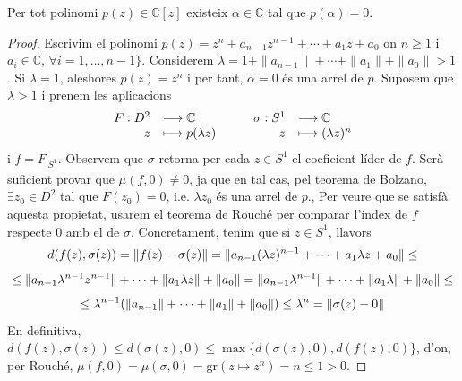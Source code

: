 \documentclass[../main.tex]{subfiles}
\begin{document}
\begin{ter}
\label{ter:teoremafonamentaldelalgebra} Per tot polinomi $p(z)\in\mathbb{C}[z]$ existeix $\alpha\in \mathbb{C}$ tal que $p(\alpha)=0$.
\end{ter}
\begin{proof}
Escrivim el polinomi $p(z) = z^n+a_{n-1}z^{n-1}+\cdots +a_1z+a_0$ on $n\geq 1$ i $a_i\in\mathbb{C}$, $\forall i=1,\ldots, n-1\}$. Considerem $\lambda = 1+\|a_{n-1}\|+\cdots+\|a_1\|+\|a_0\|>1$. Si $\lambda= 1$, aleshores $p(z) = z^n$ i per tant, $\alpha = 0$ és una arrel de $p$. Suposem que $\lambda>1$ i prenem les aplicacions
\begin{equation}
    \notag
    \begin{array}{rl}
        F:D^2 & \longrightarrow \mathbb{C} \\
        z & \longmapsto p(\lambda z)
    \end{array}
    \qquad
    \begin{array}{rl}
        \sigma:S^1 & \longrightarrow \mathbb{C} \\
        z & \longmapsto (\lambda z)^n
    \end{array}
\end{equation}
i $f = F_{|S^1}$. Observem que $\sigma$ retorna per cada $z\in S^1$ el coeficient líder de $f$. Serà suficient provar que $\mu(f,0)\not=0$, ja que en tal cas, pel teorema de Bolzano, $\exists z_0\in D^2$ tal que $F(z_0) = 0$, i.e. $\lambda z_0$ és una arrel de $p$., Per veure que se satisfà aquesta propietat, usarem el teorema de Rouché per comparar l'índex de $f$ respecte 0 amb el de $\sigma$. Concretament, tenim que si $z\in  S^1$, llavors
\begin{equation}
    \notag
    d(f(z),\sigma(z)) = \|f(z)-\sigma(z)\| = \|a_{n-1}(\lambda z)^{n-1}+\cdots+a_1\lambda z+a_0\|\leq
\end{equation}
\begin{equation}
    \notag
    \leq \|a_{n-1}\lambda^{n-1}z^{n-1}\|+\cdots+\|a_1\lambda z\|+\|a_0\| = \|a_{n-1}\lambda^{n-1}\|+\cdots+\|a_1\lambda\|+\|a_0\|\leq 
\end{equation}
\begin{equation}
    \notag
    \leq \lambda^{n-1}(\|a_{n-1}\|+\cdots+\|a_1\|+\|a_0\|) \leq \lambda^n = \|\sigma(z)-0\|
\end{equation}
En definitiva, $d(f(z),\sigma(z))\leq d(\sigma(z),0)\leq\max\{d(\sigma(z),0),d(f(z),0)\}$, d'on, per Rouché, $\mu(f,0) = \mu(\sigma,0) = \mathrm{gr}(z\mapsto z^n) = n\leq 1>0$.
\end{proof}
\end{document}
